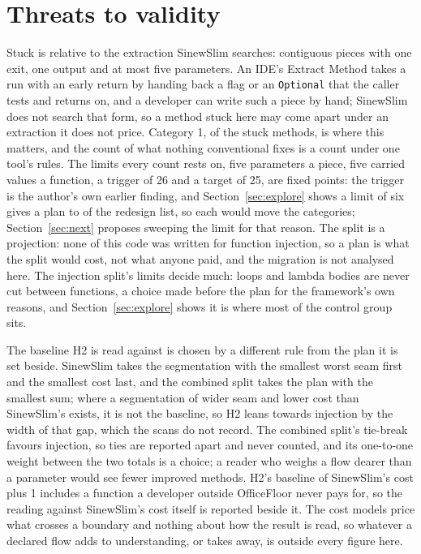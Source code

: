 \documentclass[11pt,a4paper]{article}
\newcommand{\sig}[1]{\texttt{#1}}
\newcommand{\Htwo}{H2}
\begin{document}
\section{Threats to validity}\label{sec:threats}

Stuck is relative to the extraction SinewSlim searches: contiguous pieces
with one exit, one output and at most five parameters. An IDE's Extract
Method takes a run with an early return by handing back a flag or an
\sig{Optional} that the caller tests and returns on, and a developer can
write such a piece by hand; SinewSlim does not search that form, so a method
stuck here may come apart under an extraction it does not price. Category 1,
\catOneShare{} of the stuck methods, is where this matters, and the count of
what nothing conventional fixes is a count under one tool's rules. The limits
every count rests on, five parameters a piece, five carried values a
function, a trigger of 26 and a target of 25, are fixed points: the trigger
is the author's own earlier finding, and Section~\ref{sec:explore} shows a
limit of six gives a plan to \exLimitSix{} of the redesign list, so each
would move the categories; Section~\ref{sec:next} proposes sweeping the
limit for that reason. The split is a projection: none of this code was
written for function injection, so a plan is what the split would cost, not
what anyone paid, and the migration is not analysed here. The injection
split's limits decide much: loops and lambda bodies are never cut between
functions, a choice made before the plan for the framework's own reasons,
and Section~\ref{sec:explore} shows it is where most of the control group
sits.

The baseline \Htwo{} is read against is chosen by a different rule from the
plan it is set beside. SinewSlim takes the segmentation with the smallest
worst seam first and the smallest cost last, and the combined split takes
the plan with the smallest sum; where a segmentation of wider seam and lower
cost than SinewSlim's exists, it is not the baseline, so \Htwo{} leans
towards injection by the width of that gap, which the scans do not record.
The combined split's tie-break favours injection, so ties are reported apart
and never counted, and its one-to-one weight between the two totals is a
choice; a reader who weighs a flow dearer than a parameter would see fewer
improved methods. \Htwo{}'s baseline of SinewSlim's cost plus 1 includes a
function a developer outside OfficeFloor never pays for, so the reading
against SinewSlim's cost itself is reported beside it. The cost models price
what crosses a boundary and nothing about how the result is read, so
whatever a declared flow adds to understanding, or takes away, is outside
every figure here.
\end{document}
